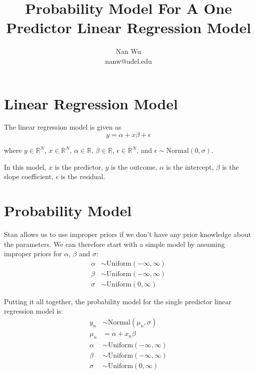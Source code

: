 \documentclass[12pt]{article}
\begin{document}
\title{Probability Model For A One Predictor Linear Regression Model}
\author{Nan Wu \\ nanw@udel.edu}
\date{}
\maketitle

\section{Linear Regression Model}

The linear regression model is given as
\begin{equation}
y=\alpha+x\beta+\epsilon
\end{equation}

where $y\in \mathbb{R}^N$, $x\in \mathbb{R}^N$, $\alpha \in \mathbb{R}$, $\beta \in \mathbb{R}$, $\epsilon \in \mathbb{R}^N$, and $\epsilon \sim \mathrm{Normal}\left( 0,\sigma \right)$.

In this model, $x$ is the predictor, $y$ is the outcome, $\alpha$ is the intercept, $\beta$ is the slope coefficient, $\epsilon$ is the residual.

\section{Probability Model}

Stan allows us to use improper priors if we don't have any prior knowledge about the parameters. We can therefore start with a simple model by assuming improper priors for $\alpha$, $\beta$ and $\sigma$:
\begin{align*}
\alpha &\sim \mathrm{Uniform}\left( -\infty,\infty \right) \\
\beta &\sim \mathrm{Uniform}\left( -\infty,\infty \right) \\
\sigma &\sim \mathrm{Uniform}\left( 0,\infty \right)
\end{align*}

Putting it all together, the probability model for the single predictor linear regression model is:
\begin{align*}
y_n &\sim \mathrm{Normal}\left( \mu_n, \sigma \right) \\
\mu_n &= \alpha + x_n\beta \\
\alpha &\sim \mathrm{Uniform}\left( -\infty,\infty \right) \\
\beta &\sim \mathrm{Uniform}\left( -\infty,\infty \right) \\
\sigma &\sim \mathrm{Uniform}\left( 0,\infty \right)
\end{align*}
\end{document}

